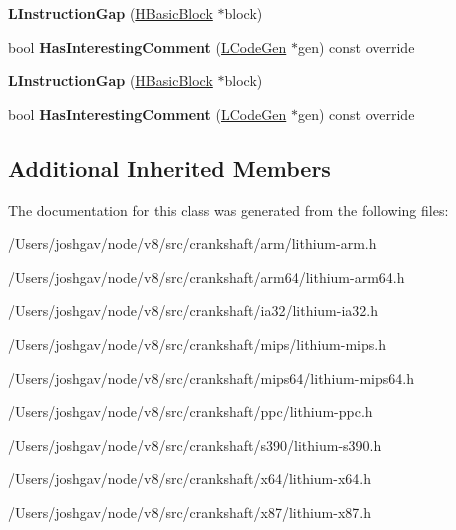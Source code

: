 \begin{DoxyCompactItemize}
\item 
{\bfseries L\+Instruction\+Gap} (\hyperlink{classv8_1_1internal_1_1_h_basic_block}{H\+Basic\+Block} $\ast$block)\hypertarget{classv8_1_1internal_1_1_l_instruction_gap_a63492d0f9e8ce8b754bb1b3a10718391}{}\label{classv8_1_1internal_1_1_l_instruction_gap_a63492d0f9e8ce8b754bb1b3a10718391}

\item 
bool {\bfseries Has\+Interesting\+Comment} (\hyperlink{classv8_1_1internal_1_1_l_code_gen}{L\+Code\+Gen} $\ast$gen) const  override\hypertarget{classv8_1_1internal_1_1_l_instruction_gap_a688fc9f317d9909675c81dbd42462bba}{}\label{classv8_1_1internal_1_1_l_instruction_gap_a688fc9f317d9909675c81dbd42462bba}

\item 
{\bfseries L\+Instruction\+Gap} (\hyperlink{classv8_1_1internal_1_1_h_basic_block}{H\+Basic\+Block} $\ast$block)\hypertarget{classv8_1_1internal_1_1_l_instruction_gap_a63492d0f9e8ce8b754bb1b3a10718391}{}\label{classv8_1_1internal_1_1_l_instruction_gap_a63492d0f9e8ce8b754bb1b3a10718391}

\item 
bool {\bfseries Has\+Interesting\+Comment} (\hyperlink{classv8_1_1internal_1_1_l_code_gen}{L\+Code\+Gen} $\ast$gen) const  override\hypertarget{classv8_1_1internal_1_1_l_instruction_gap_a688fc9f317d9909675c81dbd42462bba}{}\label{classv8_1_1internal_1_1_l_instruction_gap_a688fc9f317d9909675c81dbd42462bba}

\end{DoxyCompactItemize}
\subsection*{Additional Inherited Members}


The documentation for this class was generated from the following files\+:\begin{DoxyCompactItemize}
\item 
/\+Users/joshgav/node/v8/src/crankshaft/arm/lithium-\/arm.\+h\item 
/\+Users/joshgav/node/v8/src/crankshaft/arm64/lithium-\/arm64.\+h\item 
/\+Users/joshgav/node/v8/src/crankshaft/ia32/lithium-\/ia32.\+h\item 
/\+Users/joshgav/node/v8/src/crankshaft/mips/lithium-\/mips.\+h\item 
/\+Users/joshgav/node/v8/src/crankshaft/mips64/lithium-\/mips64.\+h\item 
/\+Users/joshgav/node/v8/src/crankshaft/ppc/lithium-\/ppc.\+h\item 
/\+Users/joshgav/node/v8/src/crankshaft/s390/lithium-\/s390.\+h\item 
/\+Users/joshgav/node/v8/src/crankshaft/x64/lithium-\/x64.\+h\item 
/\+Users/joshgav/node/v8/src/crankshaft/x87/lithium-\/x87.\+h\end{DoxyCompactItemize}
